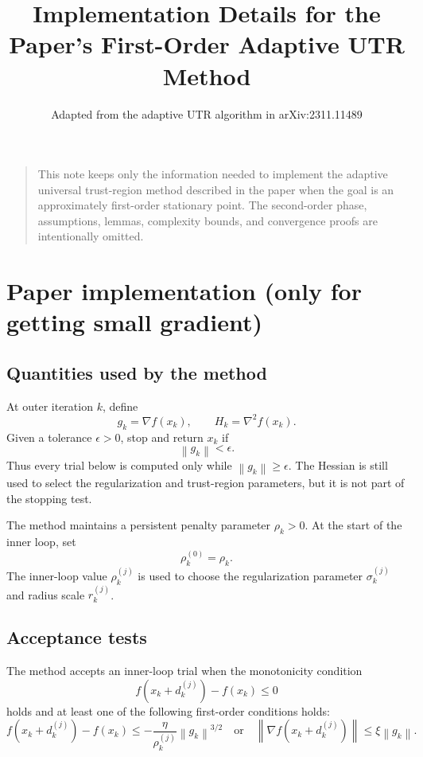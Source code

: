 \documentclass[11pt]{article}
\title{Implementation Details for the Paper's First-Order Adaptive UTR Method}
\author{Adapted from the adaptive UTR algorithm in arXiv:2311.11489}
\date{}
\newcommand{\norm}[1]{\left\lVert #1\right\rVert}
\newcommand{\grad}{\nabla}
\newcommand{\hess}{\nabla^2}
\begin{document}
\maketitle

\begin{quote}\small
This note keeps only the information needed to implement the adaptive
universal trust-region method described in the paper when the goal is an
approximately first-order stationary point.  The second-order phase,
assumptions, lemmas, complexity bounds, and convergence proofs are
intentionally omitted.
\end{quote}

\vspace{0.5em}

\section{Paper implementation (only for getting small gradient)}

\subsection{Quantities used by the method}

At outer iteration $k$, define
\[
    g_k=\grad f(x_k),
    \qquad
    H_k=\hess f(x_k).
\]
Given a tolerance $\epsilon>0$, stop and return $x_k$ if
\[
    \norm{g_k}<\epsilon.
\]
Thus every trial below is computed only while $\norm{g_k}\geq\epsilon$.  The
Hessian is still used to select the regularization and trust-region parameters,
but it is not part of the stopping test.

The method maintains a persistent penalty parameter $\rho_k>0$.  At the start
of the inner loop, set
\[
    \rho_k^{(0)}=\rho_k.
\]
The inner-loop value $\rho_k^{(j)}$ is used to choose the regularization
parameter $\sigma_k^{(j)}$ and radius scale $r_k^{(j)}$.

\subsection{Acceptance tests}

The method accepts an inner-loop trial when the monotonicity condition
\[
    f(x_k+d_k^{(j)})-f(x_k)\leq 0
\]
holds and at least one of the following first-order conditions holds:
\[
    f(x_k+d_k^{(j)})-f(x_k)
    \leq
    -\frac{\eta}{\rho_k^{(j)}}\norm{g_k}^{3/2}
    \quad\text{or}\quad
    \norm{\grad f(x_k+d_k^{(j)})}\leq \xi\norm{g_k}.
\]
\end{document}
